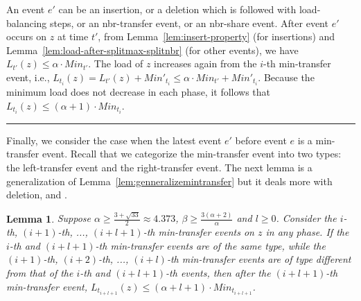 \documentclass[a4paper]{article}
\newtheorem{lemma}{Lemma}
\newenvironment{proof}{{\bf Proof:}}{\hfill\rule{1.5mm}{3mm}\vspace{0.1in}}
\begin{document}
\begin{proof}
  An event $e'$ can be an insertion, or a deletion which is followed with
  load-balancing steps, or  an nbr-transfer event, or an nbr-share event.  
  After event $e'$ occurs on $z$ at time $t'$,
  from Lemma~\ref{lem:insert-property} (for insertions) and
  Lemma~\ref{lem:load-after-splitmax-splitnbr} (for other events), we have
  $L_{t'}(z)\leq\alpha\cdot Min_{t'}$. The load of $z$ increases again
  from  the $i$-th min-transfer event, i.e.,
  $L_{t_{i}}(z)=L_{t'}(z)+Min'_{t_{i}}\leq \alpha\cdot
  Min_{t'}+Min'_{t_{i}}$. Because the minimum load does not
  decrease in each phase, it follows that $L_{t_{i}}(z)\leq (\alpha+1)\cdot
  Min_{t_{i}}$.
\end{proof}

Finally, we consider the case when the latest event $e'$ before event
$e$ is a min-transfer event.  Recall that we categorize the
min-transfer event into two types: the left-transfer event and the
right-transfer event.  The next lemma is a generalization of
Lemma~\ref{lem:genneralizemintransfer} but it deals more with
deletion, {\splitmax} and {\splitnbr}.

\begin{lemma}
  \label{lem:genneralizemintransfer2}
  Suppose $\alpha \geq \frac{3+\sqrt{33}}{2}\approx 4.373$,
  $\beta\geq \frac{3(\alpha+2)}{\alpha}$ and $l\geq 0$. Consider the $i$-th,
  $(i+1)$-th, ..., $(i+l+1)$-th min-transfer events on $z$ in
  any phase. If the $i$-th and $(i+l+1)$-th min-transfer
  events are of the same type, while the $(i+1)$-th, $(i+2)$-th, ...,
  $(i+l)$-th min-transfer events are of type different from that of
  the $i$-th and $(i+l+1)$-th events, then after the $(i+l+1)$-th
  min-transfer event, $L_{t_{i+l+1}}(z)\leq (\alpha+l+1)\cdot
  Min_{t_{i+l+1}}$.
\end{lemma}
\end{document}
